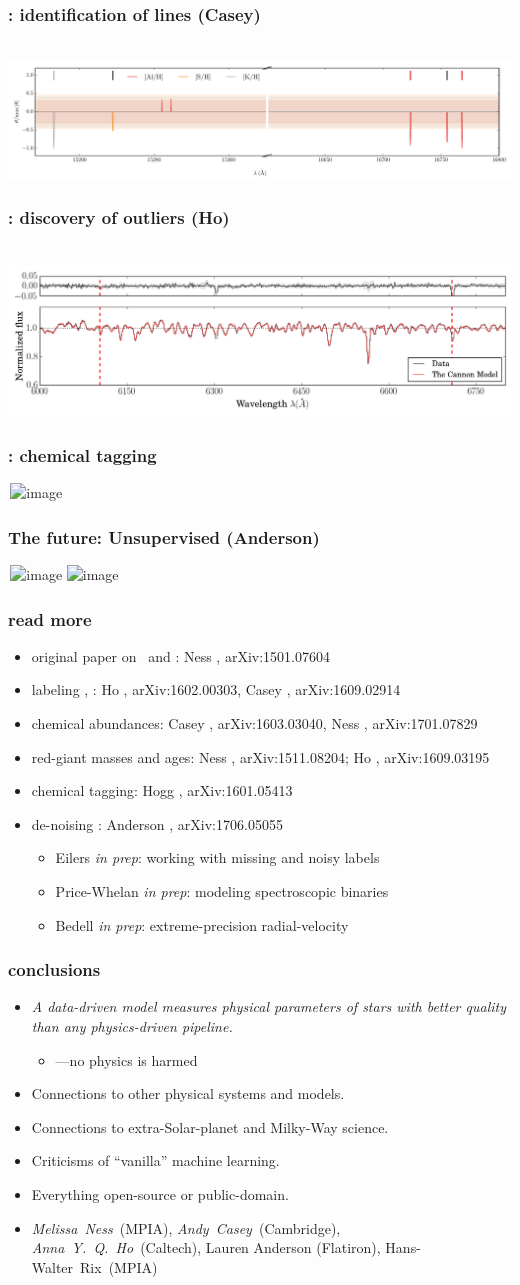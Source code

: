 \documentclass[pdftex]{beamer}
\newcommand{\conclusions}{%
\begin{frame}
  \frametitle{conclusions}
  \begin{itemize}
  \item \emph{A data-driven model measures physical parameters of stars with better quality than any physics-driven pipeline.}
    \begin{itemize}
    \item \tc ---no physics is harmed
    \end{itemize}
  \item Connections to other physical systems and models.
  \item Connections to extra-Solar-planet and Milky-Way science.
  \item Criticisms of ``vanilla'' machine learning.
  \item Everything open-source or public-domain.
  \item \emph{Melissa~Ness}~(MPIA), \emph{Andy~Casey}~(Cambridge), \emph{Anna~Y.~Q.~Ho}~(Caltech), Lauren Anderson (Flatiron), Hans-Walter~Rix~(MPIA)
  \end{itemize}
\end{frame}}
\begin{document}
\begin{frame}
  \frametitle{\tc: identification of lines (Casey)}
  \,\hfill\includegraphics[width=\figurewidth]{sparse-first-order-coefficients.pdf}%
\end{frame}

\begin{frame}
  \frametitle{\tc: discovery of outliers (Ho)}
  \,\hfill\includegraphics[width=\figurewidth]{resid_376.png}%
\end{frame}

\begin{frame}
  \frametitle{\tc: chemical tagging}
  \,\hfill\includegraphics<1>[height=\figureheight]{Sag.png}
\end{frame}

\begin{frame}
  \frametitle{The future: Unsupervised (Anderson)}
  \,\hfill\includegraphics<1>[height=\figureheight]{priorLMA.png}%
          \includegraphics<2>[height=\figureheight]{distancesM67.png}%
\end{frame}

\begin{frame}
  \frametitle{read more}
  \begin{itemize}
  \item original paper on \tc\ and \apogee: Ness \etal, arXiv:1501.07604
  \item labeling , : Ho \etal, arXiv:1602.00303, Casey \etal, arXiv:1609.02914
  \item chemical abundances: Casey \etal, arXiv:1603.03040, Ness \etal, arXiv:1701.07829
  \item red-giant masses and ages: Ness \etal, arXiv:1511.08204; Ho \etal, arXiv:1609.03195
  \item chemical tagging: Hogg \etal, arXiv:1601.05413
  \item de-noising : Anderson \etal, arXiv:1706.05055
    \begin{itemize}
    \item Eilers \textsl{in prep}: working with missing and noisy labels
    \item Price-Whelan \textsl{in prep}: modeling spectroscopic binaries
    \item Bedell \textsl{in prep}: extreme-precision radial-velocity
    \end{itemize}
  \end{itemize}
\end{frame}

\conclusions
\end{document}
